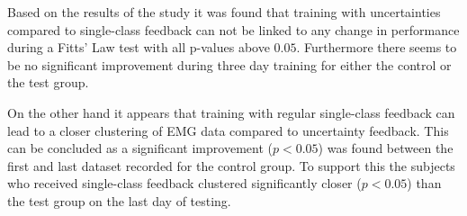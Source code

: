 Based on the results of the study it was found that training with uncertainties compared to single-class feedback can not be linked to any change in performance during a Fitts' Law test with all p-values above $0.05$. Furthermore there seems to be no significant improvement during three day training for either the control or the test group. 

On the other hand it appears that training with regular single-class feedback can lead to a closer clustering of EMG data compared to uncertainty feedback. This can be concluded as a significant improvement ($p < 0.05$) was found between the first and last dataset recorded for the control group. To support this the subjects who received single-class feedback clustered significantly closer ($p < 0.05$) than the test group on the last day of testing.